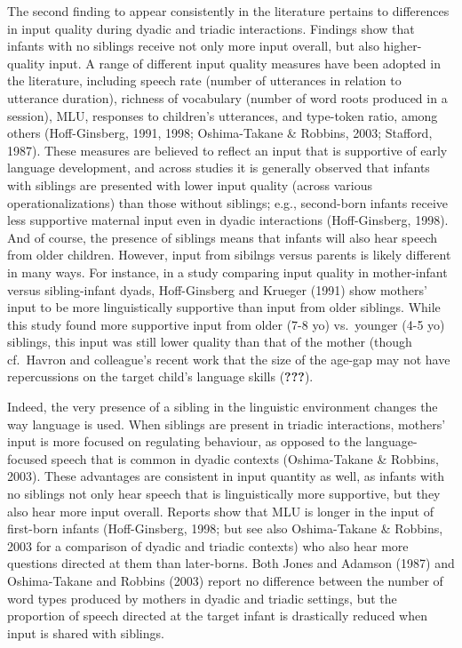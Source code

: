 \documentclass[
  english,
  man,floatsintext]{apa6}
\begin{document}
The second finding to appear consistently in the literature pertains to differences in input quality during dyadic and triadic interactions. Findings show that infants with no siblings receive not only more input overall, but also higher-quality input. A range of different input quality measures have been adopted in the literature, including speech rate (number of utterances in relation to utterance duration), richness of vocabulary (number of word roots produced in a session), MLU, responses to children's utterances, and type-token ratio, among others (Hoff-Ginsberg, 1991, 1998; Oshima-Takane \& Robbins, 2003; Stafford, 1987). These measures are believed to reflect an input that is supportive of early language development, and across studies it is generally observed that infants with siblings are presented with lower input quality (across various operationalizations) than those without siblings; e.g., second-born infants receive less supportive maternal input even in dyadic interactions (Hoff-Ginsberg, 1998). And of course, the presence of siblings means that infants will also hear speech from older children. However, input from sibilngs versus parents is likely different in many ways. For instance, in a study comparing input quality in mother-infant versus sibling-infant dyads, Hoff-Ginsberg and Krueger (1991) show mothers' input to be more linguistically supportive than input from older siblings. While this study found more supportive input from older (7-8 yo) vs.~younger (4-5 yo) siblings, this input was still lower quality than that of the mother (though cf.~Havron and colleague's recent work that the size of the age-gap may not have repercussions on the target child's language skills ({\textbf{???}}).

Indeed, the very presence of a sibling in the linguistic environment changes the way language is used. When siblings are present in triadic interactions, mothers' input is more focused on regulating behaviour, as opposed to the language-focused speech that is common in dyadic contexts (Oshima-Takane \& Robbins, 2003). These advantages are consistent in input quantity as well, as infants with no siblings not only hear speech that is linguistically more supportive, but they also hear more input overall. Reports show that MLU is longer in the input of first-born infants (Hoff-Ginsberg, 1998; but see also Oshima-Takane \& Robbins, 2003 for a comparison of dyadic and triadic contexts) who also hear more questions directed at them than later-borns. Both Jones and Adamson (1987) and Oshima-Takane and Robbins (2003) report no difference between the number of word types produced by mothers in dyadic and triadic settings, but the proportion of speech directed at the target infant is drastically reduced when input is shared with siblings.
\end{document}
